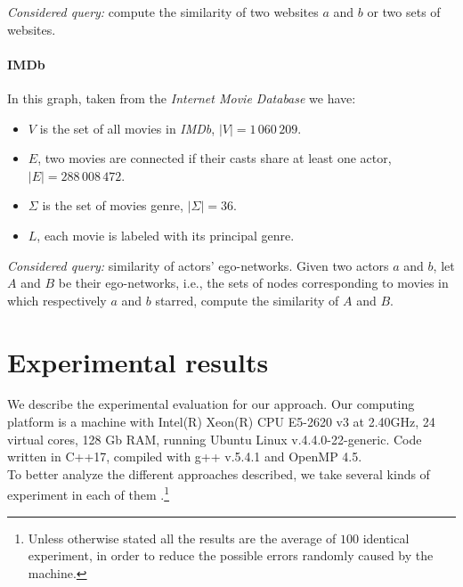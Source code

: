     \textsl{Considered query:} compute the similarity of two websites $a$ and $b$ or two sets of websites.
    
    \paragraph*{IMDb} In this graph, taken from the \textit{Internet Movie Database} we have:
    
    \begin{itemize}
    	\item $V$ is the set of all movies in \textit{IMDb},  $|V| = 1\,060\,209$.
		\item $E$, two movies are connected if their casts share at least one actor, $|E| = 288\,008\,472$.
		\item $\Sigma$ is the set of movies genre, $|\Sigma| = 36$.
		\item $L$, each movie is labeled with its principal genre.
    \end{itemize}
    
    
    \textsl{Considered query:} similarity of actors' ego-networks. Given two actors $a$ and $b$, let $A$ and $B$ be their ego-networks, i.e., the sets of nodes corresponding to movies in which respectively $a$ and $b$ starred, compute the similarity of $A$ and $B$.
    
    \section{Experimental results}

    We describe the experimental evaluation for our approach. Our computing platform is a machine with Intel(R) Xeon(R) CPU E5-2620 v3 at 2.40GHz, 24 virtual cores, 128 Gb RAM, running Ubuntu Linux v.4.4.0-22-generic. Code written in C++17, compiled with g++ v.5.4.1 and OpenMP 4.5.\\
    
    To better analyze the different approaches described, we take several kinds of experiment in each of them .\footnote{Unless otherwise stated all the results are the average of $100$ identical experiment, in order to reduce the possible errors randomly caused by the machine.}\\
     
